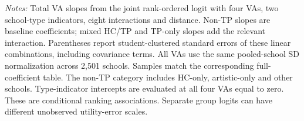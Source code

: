 \begin{table}[!htbp]
\begin{minipage}{0.98\linewidth}\footnotesize
\textit{Notes:} Total VA slopes from the joint rank-ordered logit with four VAs, two school-type indicators, eight interactions and distance. Non-TP slopes are baseline coefficients; mixed HC/TP and TP-only slopes add the relevant interaction. Parentheses report student-clustered standard errors of these linear combinations, including covariance terms. All VAs use the same pooled-school SD normalization across 2,501 schools. Samples match the corresponding full-coefficient table. The non-TP category includes HC-only, artistic-only and other schools. Type-indicator intercepts are evaluated at all four VAs equal to zero. These are conditional ranking associations. Separate group logits can have different unobserved utility-error scales.
\end{minipage}
\end{table}
